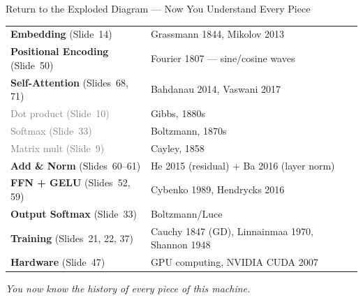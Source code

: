 \begin{frame}[shrink=25]{Return to the Exploded Diagram --- Now You Understand Every Piece}

  \begin{tcolorbox}[colback=aiViolet!3,colframe=aiViolet,
    fonttitle=\bfseries,
    title={Every Piece --- Now You Know the History},
    rounded corners,boxrule=1pt,left=4pt,right=4pt,top=4pt,bottom=4pt]
    \small
    \begin{tabular}{@{}p{3.8cm}p{7.5cm}@{}}
      \textcolor{linalgTeal}{\textbf{Embedding}} (Slide~14)
        & Grassmann 1844, Mikolov 2013 \\[2pt]
      \textcolor{approxGreen}{\textbf{Positional Encoding}} (Slide~50)
        & Fourier 1807 --- sine/cosine waves \\[2pt]
      \textcolor{seqIndigo}{\textbf{Self-Attention}} (Slides~68, 71)
        & Bahdanau 2014, Vaswani 2017 \\[2pt]
      \quad\textcolor{gray}{Dot product (Slide~10)}
        & Gibbs, 1880s \\
      \quad\textcolor{gray}{Softmax (Slide~33)}
        & Boltzmann, 1870s \\
      \quad\textcolor{gray}{Matrix mult (Slide~9)}
        & Cayley, 1858 \\[2pt]
      \textcolor{neuronPink}{\textbf{Add \& Norm}} (Slides~60--61)
        & He 2015 (residual) + Ba 2016 (layer norm) \\[2pt]
      \textcolor{approxGreen!80!black}{\textbf{FFN + GELU}} (Slides~52, 59)
        & Cybenko 1989, Hendrycks 2016 \\[2pt]
      \textcolor{probBlue}{\textbf{Output Softmax}} (Slide~33)
        & Boltzmann/Luce \\[2pt]
      \textcolor{calculusRed}{\textbf{Training}} (Slides~21, 22, 37)
        & Cauchy 1847 (GD), Linnainmaa 1970, Shannon 1948 \\[2pt]
      \textcolor{logicGray}{\textbf{Hardware}} (Slide~47)
        & GPU computing, NVIDIA CUDA 2007 \\
    \end{tabular}
  \end{tcolorbox}
  {\small\centering\itshape You now know the history of every piece
   of this machine.\par}

\end{frame}

